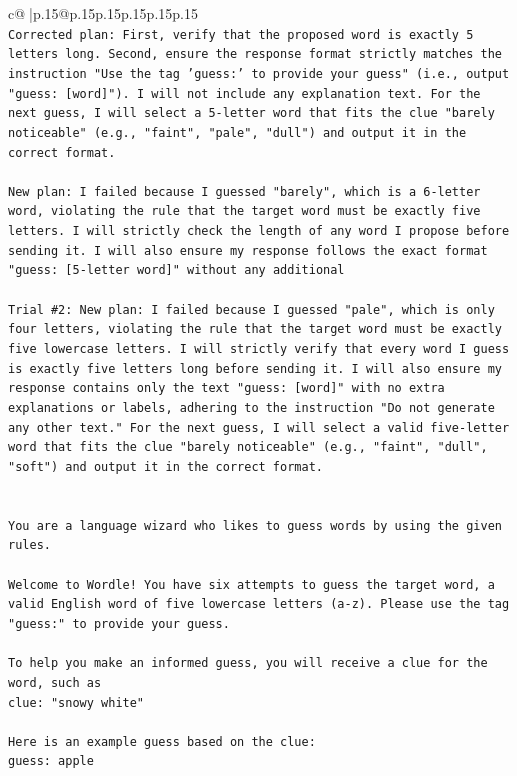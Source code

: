 \documentclass{article}
\begin{document}
{\begin{supertabular}{c@{$\;$}|p{.15\linewidth}@{}p{.15\linewidth}p{.15\linewidth}p{.15\linewidth}p{.15\linewidth}p{.15\linewidth}}
{{{\\ 
\texttt{Corrected plan: First, verify that the proposed word is exactly 5 letters long. Second, ensure the response format strictly matches the instruction "Use the tag 'guess:' to provide your guess" (i.e., output "guess: {[}word{]}"). I will not include any explanation text. For the next guess, I will select a 5{-}letter word that fits the clue "barely noticeable" (e.g., "faint", "pale", "dull") and output it in the correct format.} \\
\\ 
\texttt{New plan: I failed because I guessed "barely", which is a 6{-}letter word, violating the rule that the target word must be exactly five letters. I will strictly check the length of any word I propose before sending it. I will also ensure my response follows the exact format "guess: {[}5{-}letter word{]}" without any additional} \\
\\ 
\texttt{Trial \#2: New plan: I failed because I guessed "pale", which is only four letters, violating the rule that the target word must be exactly five lowercase letters. I will strictly verify that every word I guess is exactly five letters long before sending it. I will also ensure my response contains only the text "guess: {[}word{]}" with no extra explanations or labels, adhering to the instruction "Do not generate any other text." For the next guess, I will select a valid five{-}letter word that fits the clue "barely noticeable" (e.g., "faint", "dull", "soft") and output it in the correct format.} \\
\\ 
\\ 
\texttt{You are a language wizard who likes to guess words by using the given rules.} \\
\\ 
\texttt{Welcome to Wordle! You have six attempts to guess the target word, a valid English word of five lowercase letters (a{-}z). Please use the tag "guess:" to provide your guess.} \\
\\ 
\texttt{To help you make an informed guess, you will receive a clue for the word, such as} \\
\texttt{clue: "snowy white"} \\
\\ 
\texttt{Here is an example guess based on the clue: } \\
\texttt{guess: apple} \\
\\ 
}}}
\end{supertabular}}
\end{document}
